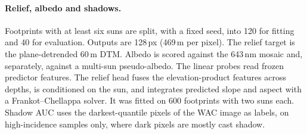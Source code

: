 \paragraph{Relief, albedo and shadows.} Footprints with at least six suns are split, with a fixed seed, into 120 for fitting and 40 for evaluation. Outputs are 128\,px (469\,m per pixel). The relief target is the plane-detrended 60\,m DTM. Albedo is scored against the 643\,nm mosaic and, separately, against a multi-sun pseudo-albedo. The linear probes read frozen predictor features. The relief head fuses the elevation-product features across depths, is conditioned on the sun, and integrates predicted slope and aspect with a Frankot--Chellappa solver. It was fitted on 600 footprints with two suns each. Shadow AUC uses the darkest-quantile pixels of the WAC image as labels, on high-incidence samples only, where dark pixels are mostly cast shadow.
